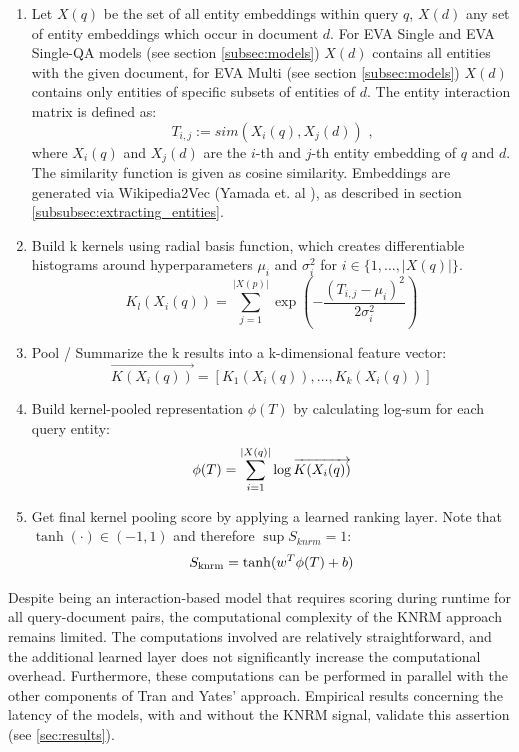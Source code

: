 \begin{enumerate}
    \item Let $X(q)$ be the set of all entity embeddings within query $q$, $X(d)$ any set of entity embeddings which occur in document $d$. For EVA Single and EVA Single-QA models (see section \ref{subsec:models}) $X(d)$ contains all entities with the given document, for EVA Multi (see section \ref{subsec:models}) $X(d)$ contains only entities of specific subsets of entities of $d$. The entity interaction matrix is defined as:
    \[T_{i,j} := sim(X_i(q), X_j(d)) \text{~,}\] 
    where $X_i(q)$ and $X_j(d)$ are the $i$-th and $j$-th entity embedding of $q$ and $d$. The similarity function is given as cosine similarity. Embeddings are generated via Wikipedia2Vec (Yamada et. al \cite{yamada2018wikipedia2vec}), as described in section \ref{subsubsec:extracting_entities}.
    \item Build k kernels using radial basis function, which creates differentiable histograms around hyperparameters $\mu_i$ and $\sigma^2_i$ for $i \in \{1, \dots, |X(q)|\}$.
    \[ K_l(X_i(q)) = \sum_{j=1}^{|X(p)|}\exp\left(-\frac{(T_{i,j}-\mu_i)^2}{2\sigma_i^2}\right)\]
    \item Pool / Summarize the k results into a k-dimensional feature vector: \[\overrightarrow{K(X_i(q))} = [K_1(X_i(q)), \ldots, K_k(X_i(q))]\]
    \item Build kernel-pooled representation $\phi(T)$ by calculating log-sum for each query entity: \vspace{-0.5cm}\[\phi(T) = \sum_{i=1}^{|X(q)|} \log \overrightarrow{K(X_i(q))}\vspace{-0.3cm}\]
    \item Get final kernel pooling score by applying a learned ranking layer. Note that $\tanh(\cdot) \in (-1, 1)$ and therefore $\sup S_{knrm} = 1$: \[ S_{\text{knrm}} = \tanh(w^T\phi(T) + b) \vspace{-0.3cm}\]
  \end{enumerate}

Despite being an interaction-based model that requires scoring during runtime for all query-document pairs, the computational complexity of the KNRM approach remains limited. The computations involved are relatively straightforward, and the additional learned layer does not significantly increase the computational overhead. Furthermore, these computations can be performed in parallel with the other components of Tran and Yates' approach. Empirical results concerning the latency of the models, with and without the KNRM signal, validate this assertion (see \autoref{sec:results}).



